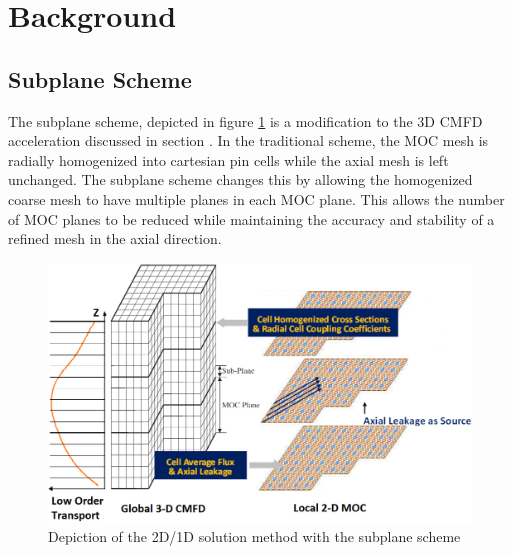 \section{Background}


\subsection{Subplane Scheme}

The subplane scheme, depicted in figure \ref{f:subplane} is a modification to the 3D CMFD acceleration discussed in section .  In the traditional scheme, the MOC mesh is radially homogenized into cartesian pin cells while the axial mesh is left unchanged.  The subplane scheme changes this by allowing the homogenized coarse mesh to have multiple planes in each MOC plane.  This allows the number of MOC planes to be reduced while maintaining the accuracy and stability of a refined mesh in the axial direction.

\begin{figure}
\includegraphics[width=6in]{figs/2d1d-subplane.png}
\caption{Depiction of the 2D/1D solution method with the subplane scheme}\label{f:subplane}
\end{figure}

